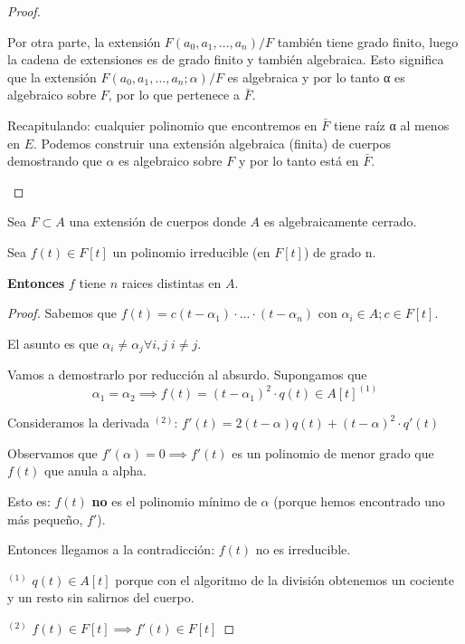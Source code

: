 \documentclass{apuntes}
\begin{document}
\begin{proof}
\begin{enumerate}
Por otra parte, la extensión $F(a_0, a_1, \dotsc, a_n) / F$ también tiene grado finito, luego la cadena de extensiones es de grado finito y también algebraica. Esto significa que la extensión $F(a_0, a_1, \dotsc, a_n; α) / F$ es algebraica y por lo tanto α es algebraico sobre $F$, por lo que pertenece a $\bar{F}$. 

Recapitulando: cualquier polinomio que encontremos en $\bar{F}$ tiene raíz α al menos en $E$. Podemos construir una extensión algebraica (finita) de cuerpos demostrando que $α$ es algebraico sobre $F$ y por lo tanto está en $\bar{F}$.
\end{enumerate}
\end{proof}

\begin{theorem}
Sea $F\subset A$ una extensión de cuerpos donde $A$ es algebraicamente cerrado. 

Sea $f(t) \in F[t]$ un polinomio irreducible (en $F[t]$) de grado n. 

\textbf{Entonces} $f$ tiene $n$ raices distintas en $A$.
\end{theorem}

\begin{proof}
Sabemos que $f(t) = c(t-\alpha_1) \cdot ... \cdot (t-\alpha_n)$ con $\alpha_i\in A; c\in F[t]$.

El asunto es que $\alpha_i\neq \alpha_j \forall i,j \; i\neq j $.

Vamos a demostrarlo por reducción al absurdo. Supongamos que \[\alpha_1 = \alpha_2 \implies f(t) = (t-\alpha_1)^2 \cdot q(t) \in A[t]^{(1)}\]




Consideramos la derivada $^{(2)}$: $f'(t) = 2(t-\alpha) q(t) + (t-\alpha)^2\cdot q'(t)$

Observamos que $f'(\alpha) = 0 \implies f'(t)$ es un polinomio de menor grado que $f(t)$ que anula a alpha.


Esto es: $f(t)$ \textbf{no} es el polinomio mínimo de $\alpha$ (porque hemos encontrado uno más pequeño, $f'$).

Entonces llegamos a la contradicción: $f(t)$ no es irreducible.


$^{(1)}$ $q(t)\in A[t]$ porque con el algoritmo de la división obtenemos un cociente y un resto sin salirnos del cuerpo.

$^{(2)}$ $f(t)\in F[t] \implies f'(t)\in F[t]$
\end{proof}
\end{document}
